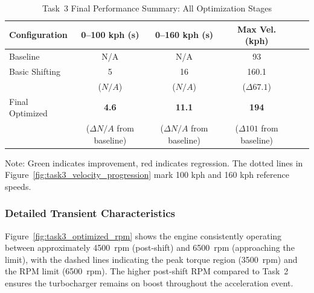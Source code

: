 \begin{table}[H]
\centering
\caption{Task~3 Final Performance Summary: All Optimization Stages}
\label{tab:task3_final_performance}
\small
\begin{tabular}{@{}lccccc@{}}
\toprule
\textbf{Configuration} & \textbf{0--100 kph (s)} & \textbf{0--160 kph (s)} & \textbf{Max Vel. (kph)} \\
\midrule
Baseline & \textcolor{baselinecolor}{N/A} & \textcolor{baselinecolor}{N/A} & \textcolor{baselinecolor}{93} \\
Basic Shifting & \textcolor{optimizedcolor}{5} & \textcolor{optimizedcolor}{16} & \textcolor{optimizedcolor}{160.1} \\
 & \textcolor{optimizedcolor}{($N/A$)} & \textcolor{optimizedcolor}{($N/A$)} & \textcolor{optimizedcolor}{($\Delta67.1$)} \\
Final Optimized & \textcolor{optimizedcolor}{\textbf{4.6}} & \textcolor{optimizedcolor}{\textbf{11.1}} & \textcolor{optimizedcolor}{\textbf{194}} \\
 & \textcolor{improvementcolor}{($\Delta N/A$ from baseline)} & \textcolor{improvementcolor}{($\Delta N/A$ from baseline)} & \textcolor{improvementcolor}{($\Delta101$ from baseline)} \\
\bottomrule
\end{tabular}
\end{table}

Note: Green indicates improvement, red indicates regression. The dotted lines in Figure~\ref{fig:task3_velocity_progression} mark 100 kph and 160 kph reference speeds.

\subsubsection{Detailed Transient Characteristics}

Figure~\ref{fig:task3_optimized_rpm} shows the engine consistently operating between approximately 4500~rpm (post-shift) and 6500~rpm (approaching the limit), with the dashed lines indicating the peak torque region (3500~rpm) and the RPM limit (6500~rpm). The higher post-shift RPM compared to Task~2 ensures the turbocharger remains on boost throughout the acceleration event.

